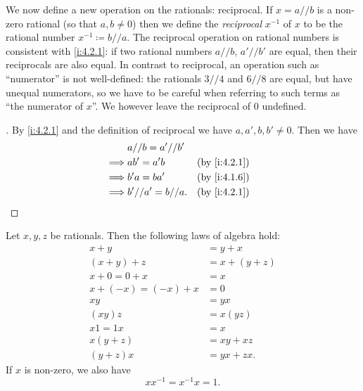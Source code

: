 \begin{ac}\label{i:ac:4.2.3}
  We now define a new operation on the rationals: reciprocal.
  If \(x = a // b\) is a non-zero rational (so that \(a, b \neq 0\)) then we define the \emph{reciprocal} \(x^{-1}\) of \(x\) to be the rational number \(x^{-1} \coloneqq b // a\).
  The reciprocal operation on rational numbers is consistent with \cref{i:4.2.1}:
  if two rational numbers \(a // b\), \(a' // b'\) are equal, then their reciprocals are also equal.
  In contrast to reciprocal, an operation such as ``numerator'' is not well-defined:
  the rationals \(3 // 4\) and \(6 // 8\) are equal, but have unequal numerators, so we have to be careful when referring to such terms as ``the numerator of \(x\)''.
  We however leave the reciprocal of \(0\) undefined.
\end{ac}

\begin{proof}[]
  By \cref{i:4.2.1} and the definition of reciprocal we have \(a, a', b, b' \neq 0\).
  Then we have
  \begin{align*}
             & a // b = a' // b'                    \\
    \implies & ab' = a'b          &  & \by{i:4.2.1} \\
    \implies & b'a = ba'          &  & \by{i:4.1.6} \\
    \implies & b' // a' = b // a. &  & \by{i:4.2.1}
  \end{align*}
\end{proof}

\begin{prop}\label{i:4.2.4}
  Let \(x, y, z\) be rationals.
  Then the following laws of algebra hold:
  \begin{align*}
    x + y               & = y + x       \\
    (x + y) + z         & = x + (y + z) \\
    x + 0 = 0 + x       & = x           \\
    x + (-x) = (-x) + x & = 0           \\
    xy                  & = yx          \\
    (xy)z               & = x(yz)       \\
    x1 = 1x             & = x           \\
    x(y + z)            & = xy + xz     \\
    (y + z)x            & = yx + zx.
  \end{align*}
  If \(x\) is non-zero, we also have
  \[
    xx^{-1} = x^{-1}x = 1.
  \]
\end{prop}

